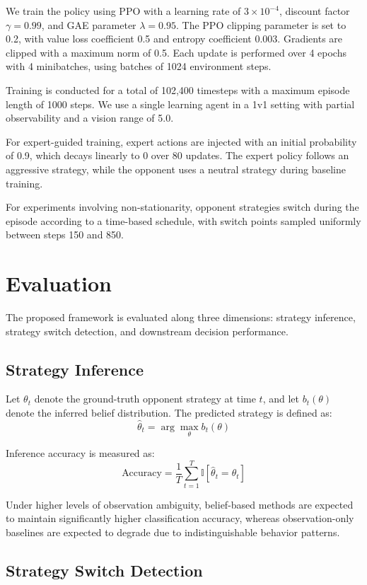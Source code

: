 \documentclass{article}
\begin{document}
We train the policy using PPO with a learning rate of $3\times 10^{-4}$, discount factor $\gamma=0.99$, and GAE parameter $\lambda=0.95$. 
The PPO clipping parameter is set to 0.2, with value loss coefficient 0.5 and entropy coefficient 0.003. 
Gradients are clipped with a maximum norm of 0.5. 
Each update is performed over 4 epochs with 4 minibatches, using batches of 1024 environment steps.

Training is conducted for a total of 102,400 timesteps with a maximum episode length of 1000 steps. 
We use a single learning agent in a 1v1 setting with partial observability and a vision range of 5.0.

For expert-guided training, expert actions are injected with an initial probability of 0.9, which decays linearly to 0 over 80 updates. 
The expert policy follows an aggressive strategy, while the opponent uses a neutral strategy during baseline training.

For experiments involving non-stationarity, opponent strategies switch during the episode according to a time-based schedule, 
with switch points sampled uniformly between steps 150 and 850.

\section{Evaluation}

The proposed framework is evaluated along three dimensions: strategy inference, strategy switch detection, and downstream decision performance.

\subsection{Strategy Inference}

Let $\theta_t$ denote the ground-truth opponent strategy at time $t$, and let $b_t(\theta)$ denote the inferred belief distribution. The predicted strategy is defined as:
\[
\hat{\theta}_t = \arg\max_{\theta} b_t(\theta)
\]

Inference accuracy is measured as:
\[
\text{Accuracy} = \frac{1}{T} \sum_{t=1}^{T} \mathbb{I}[\hat{\theta}_t = \theta_t]
\]

Under higher levels of observation ambiguity, belief-based methods are expected to maintain significantly higher classification accuracy, whereas observation-only baselines are expected to degrade due to indistinguishable behavior patterns.

\subsection{Strategy Switch Detection}
\end{document}
